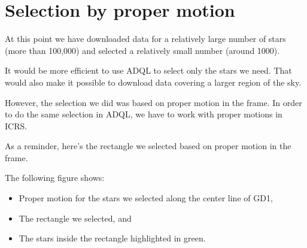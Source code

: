 \documentclass[letterpaper,10pt,english]{sphinxmanual}
\begin{document}
\section{Selection by proper motion}
\label{\detokenize{04_select:selection-by-proper-motion}}
At this point we have downloaded data for a relatively large number of stars (more than 100,000) and selected a relatively small number (around 1000).

It would be more efficient to use ADQL to select only the stars we need.  That would also make it possible to download data covering a larger region of the sky.

However, the selection we did was based on proper motion in the  frame.  In order to do the same selection in ADQL, we have to work with proper motions in ICRS.

As a reminder, here’s the rectangle we selected based on proper motion in the  frame.

\begin{sphinxVerbatim}[commandchars=\\\{\}]
  
  
  
   
\end{sphinxVerbatim}

\begin{sphinxVerbatim}[commandchars=\\\{\}]
   

  \PYG{p}{[}    \PYG{p}{]}  
  \PYG{p}{[}    \PYG{p}{]}  
\end{sphinxVerbatim}

The following figure shows:
\begin{itemize}
\item {} 
Proper motion for the stars we selected along the center line of GD\sphinxhyphen{}1,

\item {} 
The rectangle we selected, and

\item {} 
The stars inside the rectangle highlighted in green.

\end{itemize}
\end{document}

